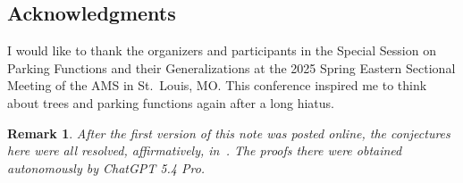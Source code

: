 \documentclass[11pt]{amsart}
\newtheorem{Remark}[thm]{Remark}
\newenvironment{remark}
  {\begin{Remark}\rm}{\end{Remark}}
\begin{document}
\subsection*{Acknowledgments} 
I would like to thank the organizers and participants in the Special Session on Parking Functions and their Generalizations at the 2025 Spring Eastern Sectional Meeting of the AMS in St.~Louis, MO. This conference inspired me to think about trees and parking functions again after a long hiatus.

\begin{remark}
After the first version of this note was posted online, the conjectures here were all resolved, affirmatively, in~\cite{defant2026short}. The proofs there were obtained autonomously by ChatGPT 5.4 Pro.
\end{remark}

{}

\end{document}
